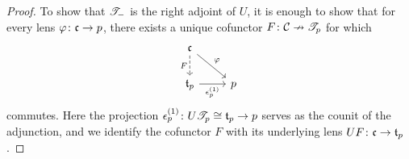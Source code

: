 \documentclass[Book-Poly]{subfiles}
\begin{document}
\begin{proof}
To show that $\mathscr{T}_{-}$ is the right adjoint of $U$, it is enough to show that for every lens $\varphi\colon\mathfrak{c}\to p$, there exists a unique cofunctor $F\colon\mathcal{C}\nrightarrow\mathscr{T}_{p}$ for which
\begin{equation} \label{eqn.cofree_universal_lens_counit}
\begin{tikzcd}
    \car{c} \ar[d,dashed,"F"'] \ar[dr,"\varphi"] \\
    \car{t}_p \ar[r,"\epsilon^{(1)}_p"'] & p
\end{tikzcd}
\end{equation}
commutes.
Here the projection $\epsilon^{(1)}_p\colon U\mathscr{T}_{p}\cong\mathfrak{t}_p\to p$ serves as the counit of the adjunction, and we identify the cofunctor $F$ with its underlying lens $UF\colon\mathfrak{c}\to\mathfrak{t}_p$.


\end{proof}
\end{document}
